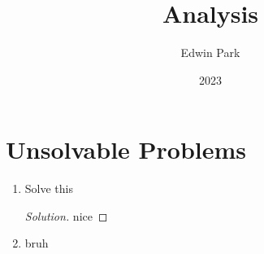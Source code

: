 \documentclass{article}
\title{Analysis}
\author{Edwin Park}
\date{2023}
\theoremstyle{definition}
\newenvironment{soln}
  {\begin{proof}[Solution]\vspace{-5pt}\setlength{\parskip}{0pt}} %
  {\end{proof}\vspace{-5pt}} %
\begin{document}
\clearpage\maketitle\thispagestyle{empty} %
\newpage
\tableofcontents
\newpage\setcounter{page}{1}

\section{}
\section{Unsolvable Problems}
\begin{enumerate}
	\item Solve this
	\begin{soln}
		nice
	\end{soln}
	\item bruh
\end{enumerate}
\end{document}
